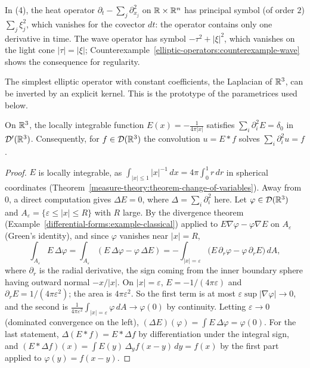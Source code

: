 In (4), the heat operator $\partial_t - \sum_j\partial_{x_j}^2$ on $\mathbb{R} \times \mathbb{R}^n$ has principal symbol (of order $2$) $\sum_j\xi_j^2$, which vanishes for the covector $dt$: the operator contains only one
derivative in time. The wave operator has symbol $-\tau^2 + |\xi|^2$, which vanishes on the light cone $|\tau| = |\xi|$; Counterexample~\ref{elliptic-operators:counterexample-wave} shows the consequence for
regularity.

The simplest elliptic operator with constant coefficients, the Laplacian of $\mathbb{R}^3$, can be inverted by an explicit kernel. This is the prototype of the parametrices used below.

\begin{proposition}\label{elliptic-operators:proposition-fundamental-solution}
On $\mathbb{R}^3$, the locally integrable function $E(x) = -\frac{1}{4\pi|x|}$ satisfies $\sum_i\partial_i^2E = \delta_0$ in $\mathcal{D}'(\mathbb{R}^3)$. Consequently, for $f \in \mathcal{D}(\mathbb{R}^3)$ the convolution $u = E * f$ solves $\sum_i\partial_i^2u = f$.
\end{proposition}

\begin{proof}
$E$ is locally integrable, as $\int_{|x| \leq 1}|x|^{-1}\,dx = 4\pi\int_0^1r\,dr$ in spherical coordinates (Theorem~\ref{measure-theory:theorem-change-of-variables}). Away from $0$, a direct computation gives $\Delta E = 0$, where $\Delta = \sum_i\partial_i^2$ here. Let
$\varphi \in \mathcal{D}(\mathbb{R}^3)$ and $A_\varepsilon = \{\varepsilon \leq |x| \leq R\}$ with $R$ large. By the divergence theorem (Example~\ref{differential-forms:example-classical}) applied to $E\nabla\varphi - \varphi\nabla E$ on $A_\varepsilon$ (Green's
identity), and since $\varphi$ vanishes near $|x| = R$,
\[
\int_{A_\varepsilon}E\,\Delta\varphi = \int_{A_\varepsilon}(E\,\Delta\varphi - \varphi\,\Delta E) = -\int_{|x| = \varepsilon}\big(E\,\partial_r\varphi - \varphi\,\partial_rE\big)\,dA,
\]
where $\partial_r$ is the radial derivative, the sign coming from the inner boundary sphere having outward normal $-x/|x|$. On $|x| = \varepsilon$, $E = -1/(4\pi\varepsilon)$ and $\partial_rE = 1/(4\pi\varepsilon^2)$; the area is $4\pi\varepsilon^2$. So the first term is
at most $\varepsilon\sup|\nabla\varphi| \to 0$, and the second is $\frac{1}{4\pi\varepsilon^2}\int_{|x| = \varepsilon}\varphi\,dA \to \varphi(0)$ by continuity. Letting $\varepsilon \to 0$ (dominated convergence on the left),
$(\Delta E)(\varphi) = \int E\,\Delta\varphi = \varphi(0)$. For the last statement, $\Delta(E * f) = E * \Delta f$ by differentiation under the integral sign, and $(E * \Delta f)(x) = \int E(y)\,\Delta_y f(x - y)\,dy = f(x)$ by the first part applied
to $\varphi(y) = f(x - y)$.
\end{proof}

